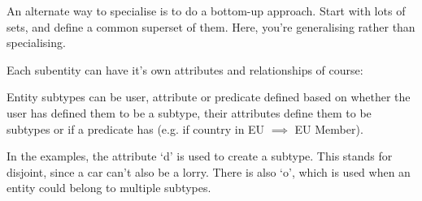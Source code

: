 An alternate way to specialise is to do a bottom-up approach. Start with lots of
sets, and define a common superset of them. Here, you're generalising rather
than specialising.

Each subentity can have it's own attributes and relationships of course:

\begin{center}
\end{center}

Entity subtypes can be user, attribute or predicate defined based on whether the
user has defined them to be a subtype, their attributes define them to be
subtypes or if a predicate has (e.g. if country in EU $\implies$ EU Member).

In the examples, the attribute `d' is used to create a subtype. This stands for
disjoint, since a car can't also be a lorry. There is also `o', which is used
when an entity could belong to multiple subtypes.
